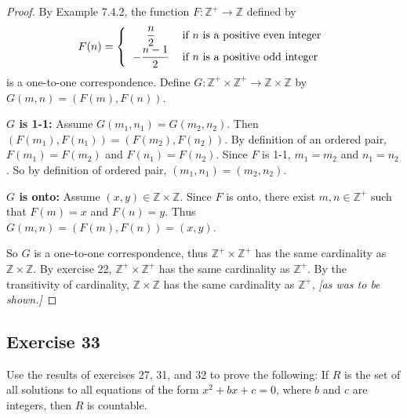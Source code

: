 \documentclass[14pt]{extarticle}
\newcommand{\dps}{\displaystyle}
\newcommand{\Z}{\mathbb{Z}}
\begin{document}
\begin{proof}
By Example 7.4.2, the function \(F:\Z^+ \to \Z\) defined by
\[
F(n) =
\left\{
\begin{tabular}{cl}
\(\dps \frac{n}{2}\) & if $n$ is a positive even integer \\
\(\dps -\frac{n-1}{2}\) & if $n$ is a positive odd integer
\end{tabular}
\right.
\]
is a one-to-one correspondence. Define \(G: \Z^+ \times \Z^+ \to \Z \times \Z\) by \(G(m, n) = (F(m), F(n))\).

{\bf $G$ is 1-1:} Assume \(G(m_1, n_1) = G(m_2, n_2)\). Then \((F(m_1), F(n_1)) = (F(m_2), F(n_2))\). By definition
of an ordered pair, \(F(m_1) = F(m_2)\) and \(F(n_1) = F(n_2)\). Since $F$ is 1-1, \(m_1 = m_2\) and \(n_1 =n_2\).
So by definition of ordered pair, \((m_1, n_1) = (m_2, n_2)\).

{\bf $G$ is onto:} Assume \((x,y) \in \Z \times \Z\). Since $F$ is onto, there exist \(m, n \in \Z^+\) such that 
\(F(m) = x\) and \(F(n) = y\). Thus \(G(m,n) = (F(m),F(n)) = (x,y)\). 

So $G$ is a one-to-one correspondence, thus \(\Z^+ \times \Z^+\) has the same cardinality as \(\Z \times \Z\). By 
exercise 22, \(\Z^+ \times \Z^+\) has the same cardinality as \(\Z^+\). By the transitivity of cardinality, 
\(\Z \times \Z\) has the same cardinality as \(\Z^+\), {\it [as was to be shown.]}
\end{proof}

\subsection{Exercise 33}
Use the results of exercises 27, 31, and 32 to prove the following: If $R$ is the set of all solutions to all equations of the form \(x^2 + bx + c = 0\), where $b$ and $c$ are integers, then $R$ is countable.
\end{document}
